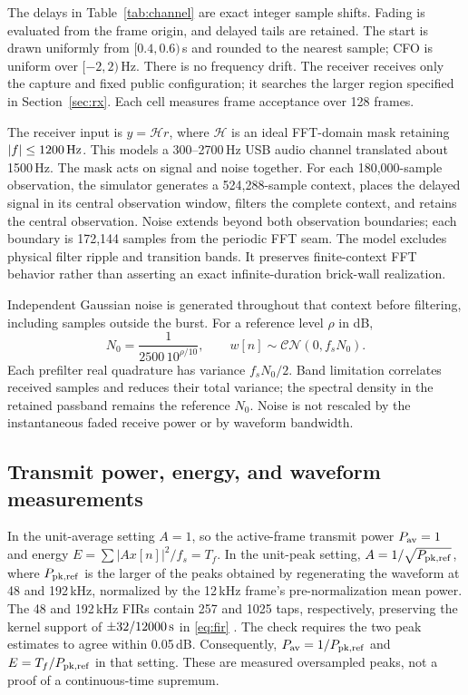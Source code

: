 The delays in Table~\ref{tab:channel} are exact integer sample shifts.
Fading is evaluated from the frame origin, and delayed tails are retained.
The start is drawn uniformly from $[0.4,0.6)$\,s and rounded to the nearest
sample; CFO is uniform over $[-2,2)$\,Hz. There is no frequency drift.
The receiver receives only the capture and fixed public configuration;
it searches the larger region specified in Section~\ref{sec:rx}.
Each cell measures frame acceptance over 128 frames.

The receiver input is $y=\mathcal H r$, where $\mathcal H$ is an ideal
FFT-domain mask retaining $|f|\le1200\,\mathrm{Hz}$. This models a 300--2700\,Hz
USB audio channel translated about 1500\,Hz. The mask acts on signal and
noise together. For each 180,000-sample observation, the simulator generates
a 524,288-sample context, places the delayed signal in its central observation window, filters
the complete context, and retains the central observation. Noise extends
beyond both observation boundaries; each boundary is 172,144 samples from
the periodic FFT seam. The model excludes physical filter ripple and
transition bands. It preserves finite-context FFT behavior rather than
asserting an exact infinite-duration brick-wall realization.

Independent Gaussian noise is generated throughout that context before
filtering, including samples outside the burst. For a reference level $\rho$ in dB,
\begin{equation}
 N_0=\frac{1}{2500\,10^{\rho/10}},\qquad
 w[n]\sim\mathcal{CN}(0,f_sN_0).
 \label{eq:snrref}
\end{equation}
Each prefilter real quadrature has variance $f_sN_0/2$. Band limitation
correlates received samples and reduces their total variance; the spectral
density in the retained passband remains the reference $N_0$. Noise is not
rescaled by the instantaneous faded receive power or by waveform bandwidth.

\subsection{Transmit power, energy, and waveform measurements}

In the unit-average setting $A=1$, so the active-frame transmit power
$P_{\rm av}=1$ and energy $E=\sum|Ax[n]|^2/f_s=T_f$. In the unit-peak
setting, $A=1/\sqrt{P_{\rm pk,ref}}$, where $P_{\rm pk,ref}$ is the larger
of the peaks obtained by regenerating the waveform at 48 and 192\,kHz,
normalized by the 12\,kHz frame's pre-normalization mean power. The
48 and 192\,kHz FIRs contain 257 and 1025 taps, respectively, preserving
the kernel support of $\pm32/12000\,\mathrm{s}$ in \eqref{eq:fir}
\cite{physical}. The check requires the two peak estimates to agree within
0.05\,dB. Consequently,
$P_{\rm av}=1/P_{\rm pk,ref}$ and $E=T_f/P_{\rm pk,ref}$ in that setting.
These are measured oversampled peaks, not a proof of a continuous-time
supremum.

